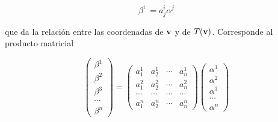 $$ \beta^i~ = a_j^i \alpha^j $$

\bigskip
\noindent
que da la relación entre las coordenadas  de $\bold{v}$ y de $T(\bold{v})$. Corresponde al producto matricial 







\bigskip

\begin{equation}
    \left(\begin{array}{c} \beta^1 \\ \beta^2 
\\  \beta^3\\ \cdots \\ \beta^n 
\end{array}
 \right)=\left(\begin{array}{cccc} a_{1}^1 & a_{2}^1&  \cdots & a_{n}^1 \\a_{1}^2  & a_{2}^2 & \cdots & a_{n}^2
\\  \cdots & \cdots  &  \cdots  & \cdots \\ a_{1}^n & a_{2}^n & \cdots & a_{n}^n
\end{array}
 \right)\left(\begin{array}{c} \alpha^1 \\ \alpha^2   
\\  \alpha^3  \\ \cdots \\ \alpha^n  
\end{array}\right)
\end{equation}

